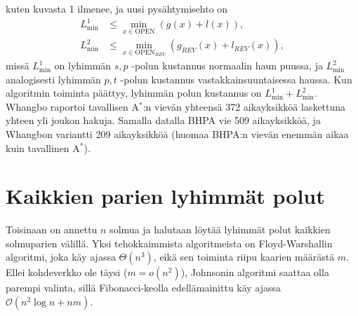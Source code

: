 \documentclass[finnish]{tktltiki2}
\theoremstyle{definition}
\theoremstyle{remark}
\begin{document}
kuten kuvasta 1 ilmenee, ja uusi pysähtymisehto on
\begin{align*}
L^1_{\min} & \leq \underset{x \in \text{OPEN}}{\min} (g(x) + l(x)), \\
L^2_{\min} & \leq \underset{x \in \text{OPEN}_{REV}}{\min} (g_{REV}(x) + l_{REV}(x)),
\end{align*}
missä $L_{\min}^1$ on lyhimmän $s, p$ -polun kustannus normaalin haun puussa, ja $L_{\min}^2$ analogisesti lyhimmän $p, t$ -polun kustannus vastakkainsuuntaisessa haussa. Kun algoritmin toiminta päättyy, lyhimmän polun kustannus on $L^1_{\min} + L^2_{\min}$. Whangbo raportoi tavallisen A$^{\ast}$:n vievän yhteensä 372 aikayksikköä laskettuna yhteen yli joukon hakuja. Samalla datalla BHPA vie 509 aikayksikköä, ja Whangbon variantti 209 aikayksikköä (huomaa BHPA:n vievän enemmän aikaa kuin tavallinen A$^{\ast}$).

\section{Kaikkien parien lyhimmät polut}
Toisinaan on annettu $n$ solmua ja halutaan löytää lyhimmät polut kaikkien solmuparien välillä. Yksi tehokkaimmista algoritmeista on Floyd-Warshallin algoritmi, joka käy ajassa $\Theta(n^3)$, eikä sen toiminta riipu kaarien määrästä $m$. Ellei kohdeverkko ole täysi ($m = o(n^2)$), Johnsonin algoritmi saattaa olla parempi valinta, sillä Fibonacci-keolla edellämainittu käy ajassa $\mathcal{O}(n^2 \log n + nm)$. 
\end{document}
